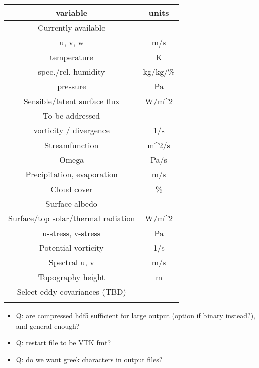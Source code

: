 \documentclass{report}
\begin{document}
\begin{center}
\begin{tabular}{ |c|c| } 
 \hline
\textbf{ variable  }                   & \textbf{units}  \\ 
 \hline
 Currently available & \\
 \hline
 u, v, w                      & m/s  \\ 
 temperature                  & K \\ 
 spec./rel. humidity          &  kg/kg/\% \\
 pressure                     & Pa \\ 
 Sensible/latent surface flux & W/m^2 \\
 \hline
 To be addressed & \\
 \hline
 vorticity / divergence       & 1/s \\ 
 Streamfunction               & m^2/s \\
 Omega                        & Pa/s \\
 Precipitation, evaporation   & m/s \\
 Cloud cover                  & \% \\
 Surface albedo               &   \\
 Surface/top solar/thermal radiation & W/m^2 \\
 u-stress, v-stress           & Pa \\
 Potential vorticity          & 1/s \\
 Spectral u, v                & m/s \\
 Topography height            & m \\
 Select eddy covariances (TBD) & \\     
 \\
 \hline
\end{tabular}
\end{center}

\begin{itemize}
    \item Q: are compressed hdf5 sufficient for large output (option if binary instead?), and general enough?
    \item Q: restart file to be VTK fmt?
    \item Q: do we want greek characters in output files?
\end{itemize}
\end{document}
